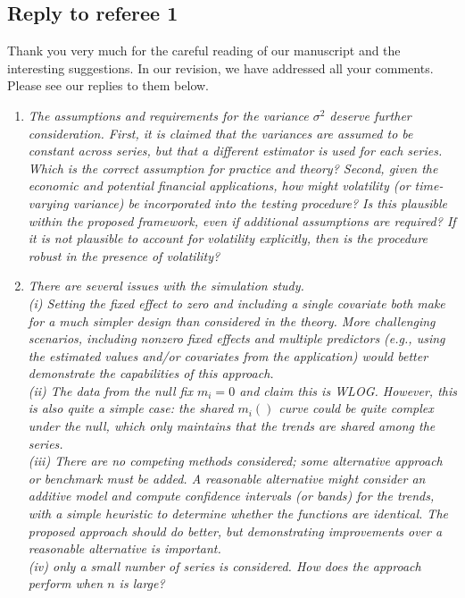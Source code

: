 \documentclass[a4paper,12pt]{article}
\begin{document}
  

\subsection*{Reply to referee 1}


Thank you very much for the careful reading of our manuscript and the interesting suggestions. In our revision, we have addressed all your comments. Please see our replies to them below.
\begin{enumerate}[label=\arabic*.,leftmargin=0.6cm]


\item \textit{The assumptions and requirements for the variance $\sigma^2$ deserve further consideration. First, it is claimed that the variances are assumed to be constant across series, but that a different estimator is used for each series. Which is the correct assumption for practice and theory? Second, given the economic and potential financial applications, how might volatility (or time-varying variance) be incorporated into the testing procedure? Is this plausible within the proposed framework, even if additional assumptions are required? If it is not plausible to account for volatility explicitly, then is the procedure robust in the presence of volatility? }


\item \textit{There are several issues with the simulation study. \\
(i) Setting the fixed effect to zero and including a single covariate both make for a much simpler design than considered in the theory. More challenging scenarios, including nonzero fixed effects and multiple predictors (e.g., using the estimated values and/or covariates from the application) would better demonstrate the capabilities of this approach. \\
(ii) The data from the null fix $m_i = 0$ and claim this is WLOG. However, this is also quite a simple case: the shared $m_i()$ curve could be quite complex under the null, which only maintains that the trends are shared among the series. \\
(iii) There are no competing methods considered; some alternative approach or benchmark must be added.  A reasonable alternative might consider an additive model and compute confidence intervals (or bands) for the trends, with a simple heuristic to determine whether the functions are identical. The proposed approach should do better, but demonstrating improvements over a reasonable alternative is important. \\
(iv) only a small number of series is considered. How does the approach perform when $n$ is large? }  


\end{enumerate}
\end{document}
